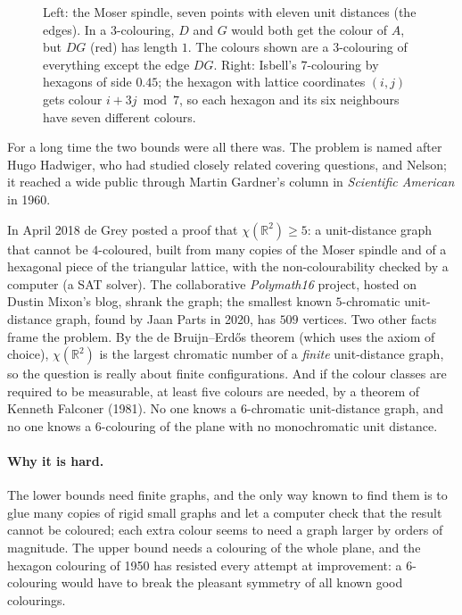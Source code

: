 \begin{figure}[ht]
\centering
{}
\caption{Left: the Moser spindle, seven points with eleven unit distances (the edges). In a $3$-colouring, $D$ and $G$ would both get the colour of $A$,
but $DG$ (red) has length $1$. The colours shown are a $3$-colouring of everything except the edge $DG$. Right: Isbell's $7$-colouring by hexagons of
side $0.45$; the hexagon with lattice coordinates $(i,j)$ gets colour $i+3j\bmod7$, so each hexagon and its six neighbours have seven different colours.}
\label{fig:spindle}
\end{figure}

For a long time the two bounds were all there was. The problem is named after Hugo Hadwiger, who had studied closely related covering questions, and
Nelson; it reached a wide public through Martin Gardner's column in \emph{Scientific American} in 1960.

\begin{remark}\label{rem:degrey}
In April 2018 de Grey posted a proof that $\chi(\mathbb R^2)\ge5$: a unit-distance graph that cannot be $4$-coloured, built from many copies of the Moser
spindle and of a hexagonal piece of the triangular lattice, with the non-colourability checked by a computer (a SAT solver). The collaborative
\emph{Polymath16} project, hosted on Dustin Mixon's blog, shrank the graph; the smallest known $5$-chromatic unit-distance
graph, found by Jaan Parts in 2020, has $509$ vertices. Two other facts frame the problem. By the de Bruijn--Erd\H os theorem (which uses the axiom of
choice), $\chi(\mathbb R^2)$ is the largest chromatic number of a \emph{finite} unit-distance graph, so the question is really about finite
configurations. And if the colour classes are required to be measurable, at least five colours are needed, by a theorem of Kenneth Falconer (1981). No
one knows a $6$-chromatic unit-distance graph, and no one knows a $6$-colouring of the plane with no monochromatic unit distance.
\end{remark}

\paragraph{Why it is hard.} The lower bounds need finite graphs, and the only way known to find them is to glue many copies of rigid small graphs and
let a computer check that the result cannot be coloured; each extra colour seems to need a graph larger by orders of magnitude. The upper bound needs a
colouring of the whole plane, and the hexagon colouring of 1950 has resisted every attempt at improvement: a $6$-colouring would have to break the
pleasant symmetry of all known good colourings.


